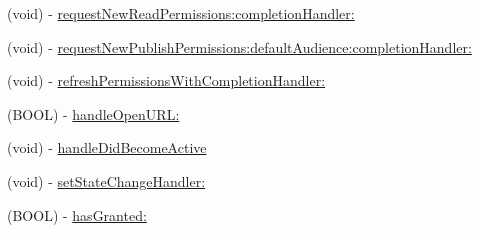 \begin{DoxyCompactItemize}
\item 
(void) -\/ \hyperlink{interfaceFBSession_a14cf87331489399e4317bda2c718d3a3}{request\+New\+Read\+Permissions\+:completion\+Handler\+:}
\item 
(void) -\/ \hyperlink{interfaceFBSession_a86dd849f0bd1f667e6107a13deb4607d}{request\+New\+Publish\+Permissions\+:default\+Audience\+:completion\+Handler\+:}
\item 
(void) -\/ \hyperlink{interfaceFBSession_a569f5daa686e4593bd0d5e68016a15a0}{refresh\+Permissions\+With\+Completion\+Handler\+:}
\item 
(B\+O\+OL) -\/ \hyperlink{interfaceFBSession_a99548fc3fd7dc7f5b8dc24019be88000}{handle\+Open\+U\+R\+L\+:}
\item 
(void) -\/ \hyperlink{interfaceFBSession_a647536f4770fc746b6865ad610779767}{handle\+Did\+Become\+Active}
\item 
(void) -\/ \hyperlink{interfaceFBSession_a56e9467165f832f3151dadd14190868b}{set\+State\+Change\+Handler\+:}
\item 
(B\+O\+OL) -\/ \hyperlink{interfaceFBSession_aa74d6239fcde1f9d6dd9530538eb691b}{has\+Granted\+:}
\end{DoxyCompactItemize}
